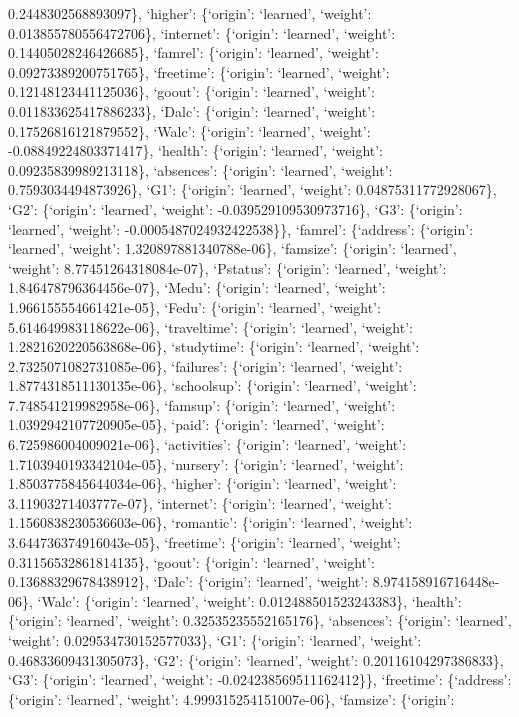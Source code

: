 \documentclass[
]{article}
\begin{document}
0.2448302568893097\}, `higher': \{`origin': `learned', `weight':
0.013855780556472706\}, `internet': \{`origin': `learned', `weight':
0.14405028246426685\}, `famrel': \{`origin': `learned', `weight':
0.09273389200751765\}, `freetime': \{`origin': `learned', `weight':
0.12148123441125036\}, `goout': \{`origin': `learned', `weight':
0.011833625417886233\}, `Dalc': \{`origin': `learned', `weight':
0.17526816121879552\}, `Walc': \{`origin': `learned', `weight':
-0.08849224803371417\}, `health': \{`origin': `learned', `weight':
0.09235839989213118\}, `absences': \{`origin': `learned', `weight':
0.7593034494873926\}, `G1': \{`origin': `learned', `weight':
0.04875311772928067\}, `G2': \{`origin': `learned', `weight':
-0.039529109530973716\}, `G3': \{`origin': `learned', `weight':
-0.0005487024932422538\}\}, `famrel': \{`address': \{`origin':
`learned', `weight': 1.320897881340788e-06\}, `famsize': \{`origin':
`learned', `weight': 8.77451264318084e-07\}, `Pstatus': \{`origin':
`learned', `weight': 1.846478796364456e-07\}, `Medu': \{`origin':
`learned', `weight': 1.966155554661421e-05\}, `Fedu': \{`origin':
`learned', `weight': 5.614649983118622e-06\}, `traveltime': \{`origin':
`learned', `weight': 1.2821620220563868e-06\}, `studytime': \{`origin':
`learned', `weight': 2.7325071082731085e-06\}, `failures': \{`origin':
`learned', `weight': 1.8774318511130135e-06\}, `schoolsup': \{`origin':
`learned', `weight': 7.748541219982958e-06\}, `famsup': \{`origin':
`learned', `weight': 1.0392942107720905e-05\}, `paid': \{`origin':
`learned', `weight': 6.725986004009021e-06\}, `activities': \{`origin':
`learned', `weight': 1.7103940193342104e-05\}, `nursery': \{`origin':
`learned', `weight': 1.8503775845644034e-06\}, `higher': \{`origin':
`learned', `weight': 3.11903271403777e-07\}, `internet': \{`origin':
`learned', `weight': 1.1560838230536603e-06\}, `romantic': \{`origin':
`learned', `weight': 3.644736374916043e-05\}, `freetime': \{`origin':
`learned', `weight': 0.31156532861814135\}, `goout': \{`origin':
`learned', `weight': 0.13688329678438912\}, `Dalc': \{`origin':
`learned', `weight': 8.974158916716448e-06\}, `Walc': \{`origin':
`learned', `weight': 0.012488501523243383\}, `health': \{`origin':
`learned', `weight': 0.32535235552165176\}, `absences': \{`origin':
`learned', `weight': 0.029534730152577033\}, `G1': \{`origin':
`learned', `weight': 0.46833609431305073\}, `G2': \{`origin': `learned',
`weight': 0.20116104297386833\}, `G3': \{`origin': `learned', `weight':
-0.024238569511162412\}\}, `freetime': \{`address': \{`origin':
`learned', `weight': 4.999315254151007e-06\}, `famsize': \{`origin':
\end{document}
